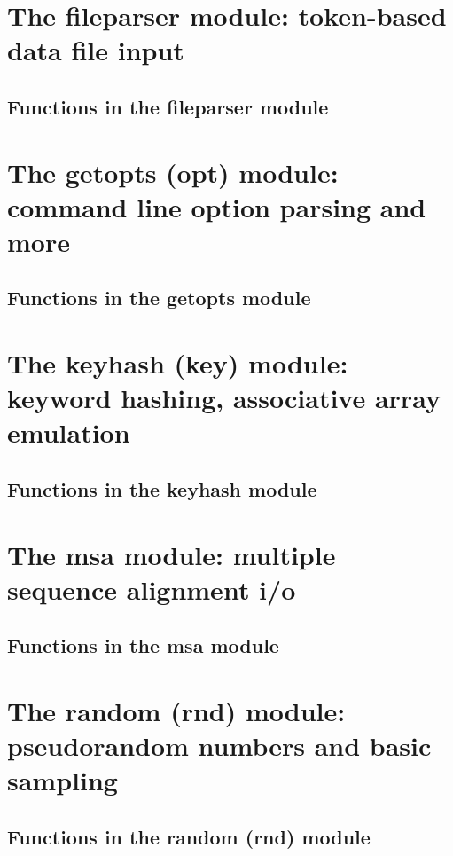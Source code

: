 \documentclass[11pt]{book}
\begin{document}
\newpage
\section{The fileparser module: token-based data file input}

\subsection{Functions in the fileparser module}


\newpage
\section{The getopts (opt) module: command line option parsing and more}

\subsection{Functions in the getopts module}


\newpage
\section{The keyhash (key) module: keyword hashing, associative array emulation}

\subsection{Functions in the keyhash module}


\newpage
\section{The msa module: multiple sequence alignment i/o}

\subsection{Functions in the msa module}


\newpage
\section{The random (rnd) module: pseudorandom numbers and basic sampling}

\subsection{Functions in the random (rnd) module}

\end{document}
